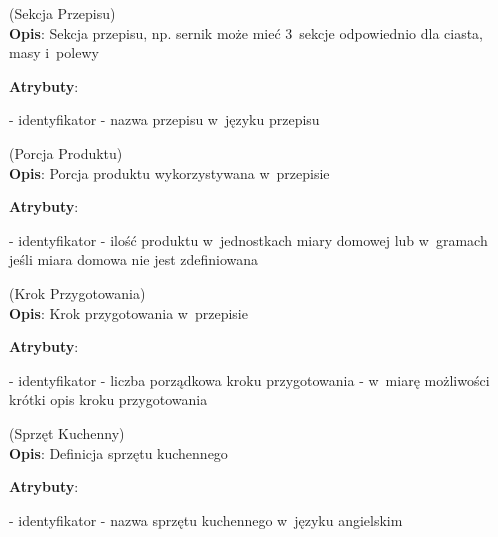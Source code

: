 \begin{enumerate}[label={\textbf{KAT/3/\protect\twodigits{\theenumi}}}, wide, labelwidth=!, labelindent=0pt, labelsep=0pt, series=reqs]
    \label{kat:RecipeSection} (Sekcja Przepisu)\\
    \indent\textbf{Opis}: Sekcja przepisu, np. sernik może mieć 3~sekcje odpowiednio dla ciasta, masy i~polewy
    \par
    \textbf{Atrybuty}:
    \begin{itemize}[series=atr, wide, align=left, leftmargin=190pt]
        \label{kat:RecipeSection:id}- identyfikator
        \label{kat:RecipeSection:sectionName}- nazwa przepisu w~języku przepisu
    \end{itemize}

    \label{kat:ProductPortion} (Porcja Produktu)\\
    \indent\textbf{Opis}: Porcja produktu wykorzystywana w~przepisie
    \par
    \textbf{Atrybuty}:
    \begin{itemize}[series=atr, wide, align=left, leftmargin=190pt]
        \label{kat:ProductPortion:id}- identyfikator
        \label{kat:ProductPortion:amount}- ilość produktu w~jednostkach miary domowej lub w~gramach jeśli miara domowa nie jest zdefiniowana
    \end{itemize}

    \label{kat:PreparationStep} (Krok Przygotowania)\\
    \indent\textbf{Opis}: Krok przygotowania w~przepisie
    \par
    \textbf{Atrybuty}:
    \begin{itemize}[series=atr, wide, align=left, leftmargin=190pt]
        \label{kat:PreparationStep:id}- identyfikator
        \label{kat:PreparationStep:ordinalNumber}- liczba porządkowa kroku przygotowania
        \label{kat:PreparationStep:stepDescription}- w~miarę możliwości krótki opis kroku przygotowania
    \end{itemize}

    \label{kat:KitchenAppliance} (Sprzęt Kuchenny)\\
    \indent\textbf{Opis}: Definicja sprzętu kuchennego
    \par
    \textbf{Atrybuty}:
    \begin{itemize}[series=atr, wide, align=left, leftmargin=190pt]
        \label{kat:KitchenAppliance:id}- identyfikator
        \label{kat:KitchenAppliance:name}- nazwa sprzętu kuchennego w~języku angielskim
    \end{itemize}


\end{enumerate}
